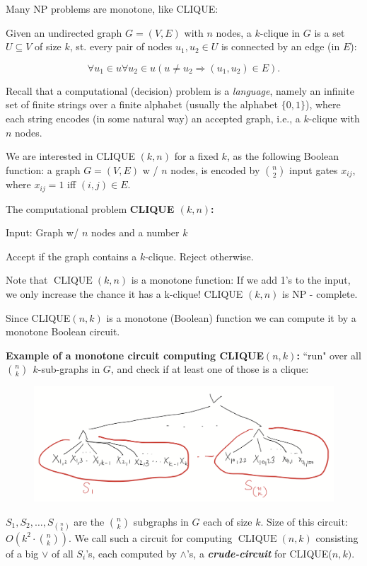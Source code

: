 Many NP problems are monotone, like CLIQUE:

Given an undirected graph $G=(V, E)$ with $n$ nodes, a $k$-clique in $G$ is a set $U\subseteq V$ of size $k$, st. every pair of nodes $u_1, u_2 \in U$ is connected by an edge (in $E$):

$$
 \forall u_1 \in u \forall u_2 \in u ( u \neq u_2\Rightarrow (u_1, u_2)\in E).
$$


Recall that a computational (decision) problem is a \emph{language}, namely an infinite set of finite strings over a finite alphabet (usually the alphabet $\{0,1\}$), where each string encodes (in some natural way) an accepted graph, i.e., a $k$-clique with $n$ nodes.

We are interested in CLIQUE $(k, n)$ for a fixed $k$, as the following Boolean function:  a graph  $G=(V, E) $ w / $n$ nodes, is encoded by $\binom{n}{2}$ input gates $x_{ij}$, where $x_{i j}=1$ iff $(i, j) \in E$.

\begin{svgraybox}
The computational problem \textbf{CLIQUE $(k, n)$:}  

Input: Graph w/ $n$ nodes and a number $k$

Accept if the graph contains a $k$-clique. Reject otherwise.
\end{svgraybox}


 Note that $\operatorname{CLIQUE}(k, n)$ is a monotone function: If we add 1's to the input, we only increase the chance it has a k-clique! CLIQUE $(k, n)$ is NP - complete.


Since CLIQUE$(n, k)$ is a monotone (Boolean)
function we can compute it by a monotone Boolean circuit.
\medskip 

\textbf{Example of a monotone circuit computing CLIQUE$(n, k)$:} ``run" over all $\binom{n}{k} ~~ k$-sub-graphs in $G$, and check if at least one of those is a clique:

\begin{figure}
    \centering
    \includegraphics[width=0.75\linewidth]{images/k-clique-simple-circuit.png}
    \label{fig:enter-label}
\end{figure}





$S_1, S_2, \ldots, S_{\binom{n}{k}}$ are the $\binom{n}{k}$ subgraphs in $G$ each of size $k$.
Size of this circuit: $O\left(k^2 \cdot\binom{n}{k}\right)$.
We call such a circuit for computing $\operatorname{CLIQUE}  (n, k)$ consisting of a big $\lor$ of all $S_i$'s, each computed by $\land$'s, a \textbf{\textit{crude-circuit}} for CLIQUE($n, k)$.
